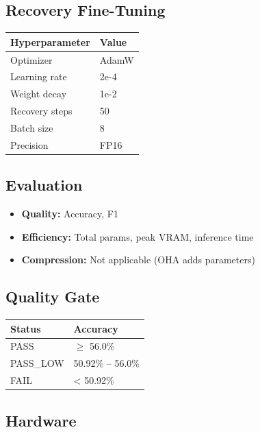 \subsection{Recovery Fine-Tuning}

\begin{table}[H]
\centering
\small
\begin{tabular}{ll}
\toprule
\textbf{Hyperparameter} & \textbf{Value} \\
\midrule
Optimizer & AdamW \\
Learning rate & 2e-4 \\
Weight decay & 1e-2 \\
Recovery steps & 50 \\
Batch size & 8 \\
Precision & FP16 \\
\bottomrule
\end{tabular}
\end{table}

\subsection{Evaluation}

\begin{itemize}
\item \textbf{Quality:} Accuracy, F1
\item \textbf{Efficiency:} Total params, peak VRAM, inference time
\item \textbf{Compression:} Not applicable (OHA adds parameters)

\end{itemize}
\subsection{Quality Gate}

\begin{table}[H]
\centering
\small
\begin{tabular}{ll}
\toprule
\textbf{Status} & \textbf{Accuracy} \\
\midrule
PASS & $\ge$ 56.0\% \\
PASS\_LOW & 50.92\% -- 56.0\% \\
FAIL & < 50.92\% \\
\bottomrule
\end{tabular}
\end{table}

\subsection{Hardware}

